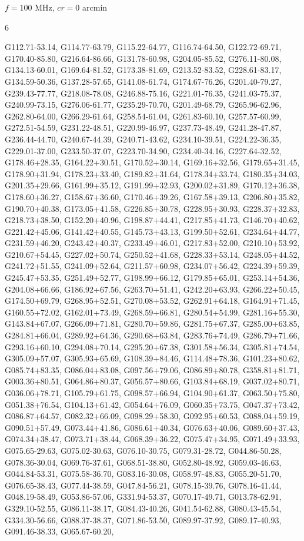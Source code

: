 \documentclass[12pt,a4paper]{article}
\newcommand{\numofcol}{6}
\begin{document}
$f = 100$ MHz, $cr = 0$ arcmin
\begin{multicols}{\numofcol}
\raggedright
\footnotesize 
G112.71-53.14, G114.77-63.79, G115.22-64.77, G116.74-64.50, G122.72-69.71, G170.40-85.80, G216.64-86.66, G131.78-60.98, G204.05-85.52, G276.11-80.08, G134.13-60.01, G169.64-81.52, G173.38-81.69, G213.52-83.52, G228.61-83.17, G134.59-50.36, G137.28-57.65, G141.08-61.74, G174.67-76.26, G201.40-79.27, G239.43-77.77, G218.08-78.08, G246.88-75.16, G221.01-76.35, G241.03-75.37, G240.99-73.15, G276.06-61.77, G235.29-70.70, G201.49-68.79, G265.96-62.96, G262.80-64.00, G266.29-61.64, G258.54-61.04, G261.83-60.10, G257.57-60.99, G272.51-54.59, G231.22-48.51, G220.99-46.97, G237.73-48.49, G241.28-47.87, G236.44-44.70, G240.67-44.39, G240.71-43.62, G234.10-39.51, G224.22-36.35, G229.01-37.00, G233.50-37.07, G223.70-34.90, G234.40-34.16, G227.64-32.52, G178.46+28.35, G164.22+30.51, G170.52+30.14, G169.16+32.56, G179.65+31.45, G178.90+31.94, G178.23+33.40, G189.82+31.64, G178.34+33.74, G180.35+34.03, G201.35+29.66, G161.99+35.12, G191.99+32.93, G200.02+31.89, G170.12+36.38, G178.60+36.27, G158.67+36.60, G170.46+39.26, G167.58+39.13, G206.80+35.82, G190.70+40.38, G173.05+41.58, G226.85+30.78, G228.95+30.93, G228.37+32.83, G218.73+38.50, G152.20+40.96, G198.87+44.41, G217.85+41.73, G146.70+40.62, G221.42+45.06, G141.42+40.55, G145.73+43.13, G199.50+52.61, G234.64+44.77, G231.59+46.20, G243.42+40.37, G233.49+46.01, G217.83+52.00, G210.10+53.92, G210.67+54.45, G227.02+50.74, G250.52+41.68, G228.33+53.14, G248.05+44.52, G241.72+51.55, G241.09+52.64, G211.57+60.98, G234.07+56.42, G224.39+59.39, G245.47+53.35, G251.49+52.77, G198.99+66.12, G179.85+65.01, G253.14+54.36, G204.08+66.66, G186.92+67.56, G263.70+51.41, G242.20+63.93, G266.22+50.45, G174.50+69.79, G268.95+52.51, G270.08+53.52, G262.91+64.18, G164.91+71.45, G160.55+72.02, G162.01+73.49, G268.59+66.81, G280.54+54.99, G281.16+55.30, G143.84+67.07, G266.09+71.81, G280.70+59.86, G281.75+67.37, G285.00+63.85, G284.81+66.04, G289.92+64.36, G290.68+63.84, G283.76+74.49, G286.79+71.66, G293.16+60.10, G294.08+70.14, G295.20+67.38, G301.58+56.34, G305.81+74.54, G305.09+57.07, G305.93+65.69, G108.39+84.46, G114.48+78.36, G101.23+80.62, G085.74+83.35, G086.04+83.08, G097.56+79.06, G086.89+80.78, G358.81+81.71, G003.36+80.51, G064.86+80.37, G056.57+80.66, G103.84+68.19, G037.02+80.71, G036.06+78.71, G105.79+61.75, G098.57+66.94, G104.90+61.37, G063.50+75.80, G051.38+76.54, G104.13+61.42, G054.64+76.09, G060.35+73.75, G047.37+73.42, G086.87+64.57, G082.32+66.09, G098.29+58.30, G092.95+60.53, G088.04+59.19, G090.51+57.49, G073.44+41.86, G086.61+40.34, G076.63+40.06, G089.60+37.43, G074.34+38.47, G073.71+38.44, G068.39+36.22, G075.47+34.95, G071.49+33.93, G075.65-29.63, G075.02-30.63, G076.10-30.75, G079.31-28.72, G044.86-50.28, G078.36-30.04, G069.76-37.61, G068.51-38.80, G052.80-48.92, G059.03-46.63, G044.84-53.31, G075.58-36.70, G083.16-30.08, G058.97-48.83, G055.20-51.70, G076.65-38.43, G077.44-38.59, G047.84-56.21, G078.15-39.76, G078.16-41.44, G048.19-58.49, G053.86-57.06, G331.94-53.37, G070.17-49.71, G013.78-62.91, G329.10-52.55, G086.11-38.17, G084.43-40.26, G041.54-62.88, G080.43-45.54, G334.30-56.66, G088.37-38.37, G071.86-53.50, G089.97-37.92, G089.17-40.93, G091.46-38.33, G065.67-60.20, 
\end{multicols}
\end{document}
